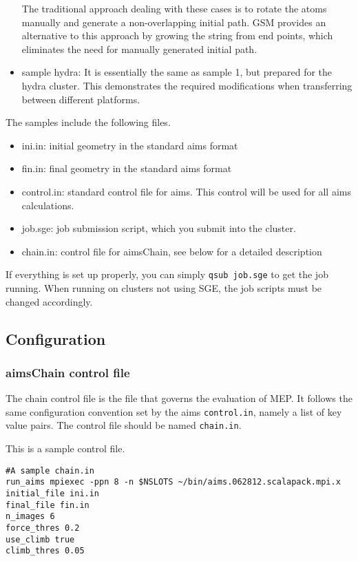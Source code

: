\begin{itemize}
The traditional approach dealing with these cases is to rotate the atoms manually and generate a non-overlapping initial path. GSM provides an alternative to this approach by growing the string from end points, which eliminates the need for manually generated initial path. 
\item sample hydra: It is essentially the same as sample 1, but prepared for the hydra cluster. This demonstrates the required modifications when transferring between different platforms.  
\end{itemize}

The samples include the following files. 
\begin{itemize}
 \item ini.in: initial geometry in the standard aims format
 \item fin.in: final geometry in the standard aims format
 \item control.in: standard control file for aims. This control will be used for all aims calculations.
 \item job.sge: job submission script, which you submit into the cluster. 
 \item chain.in: control file for aimsChain, see below for a detailed description
\end{itemize}
If everything is set up properly, you can simply \texttt{qsub job.sge} to get the job running. When running on clusters not using SGE, the job scripts must be changed accordingly. 

\subsection{Configuration}
\subsubsection*{aimsChain control file}
The chain control file is the file that governs the evaluation of MEP. It follows the same configuration convention set by the aims \texttt{control.in}, namely a list of key value pairs. The control file should be named \texttt{chain.in}.

This is a sample control file.

\begin{verbatim}
#A sample chain.in
run_aims mpiexec -ppn 8 -n $NSLOTS ~/bin/aims.062812.scalapack.mpi.x
initial_file ini.in
final_file fin.in
n_images 6
force_thres 0.2
use_climb true
climb_thres 0.05
\end{verbatim}

